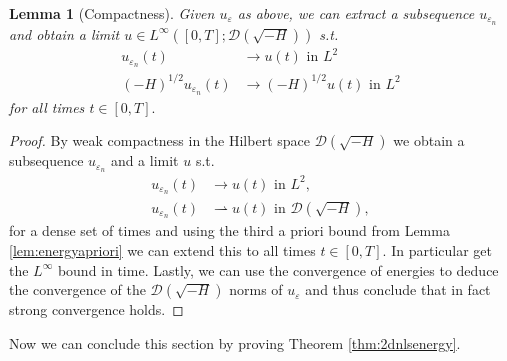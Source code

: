 \documentclass[11pt, oneside]{article}   	%
\newtheorem{lemma}[theorem]{Lemma}
\newcommand{\ED}{\mathscr{D} ( \sqrt{-H})}
\begin{document}
\begin{lemma}[Compactness]\label{lem:energycompact}
	Given $u_\varepsilon$ as above, we can extract a subsequence $u_{\varepsilon_n}$ and obtain a limit $u\in L^\infty([0,T];\ED)$ s.t.
	\begin{align}
	u_{\varepsilon_n}(t)&\to u(t) \textrm{ in } L^2\\
	(-H)^{1/2} u_{\varepsilon_n}(t)&\to (-H)^{1/2} u(t) \text{ in } L^2
	\end{align}
	for all %
	times $t\in[0,T].$
\end{lemma}
\begin{proof}
By weak compactness in the Hilbert space $\ED$ we obtain a subsequence $u_{\varepsilon_n}$ and a limit $u$ s.t.
\begin{align*}
u_{\varepsilon_n}(t)&\to u(t) \text{ in } L^2,\\
 u_{\varepsilon_n}(t)&\rightharpoonup u(t) \text{ in } \ED,
\end{align*}	
	for a dense set of times and using the third a priori bound from Lemma \ref{lem:energyapriori} we can extend this to all times $t\in[0,T]$. In particular get the $L^\infty$ bound in time. Lastly, we can use the convergence of energies to deduce the convergence of the $\ED$ norms of $u_\varepsilon$ and thus conclude that in fact strong convergence holds.

\end{proof}


Now we can conclude this section by proving Theorem \ref{thm:2dnlsenergy}.
\end{document}
